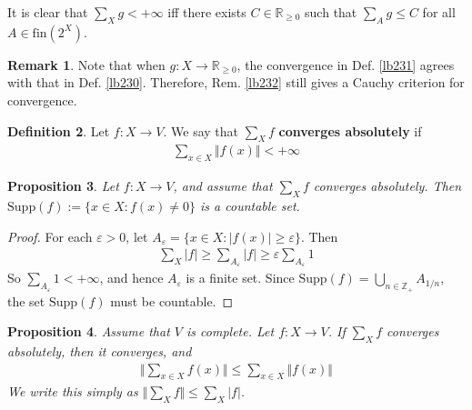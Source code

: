 \documentclass[12pt,b5paper,notitlepage]{article}
\theoremstyle{definition}
\newtheorem{df}{Definition}[subsection]
\newtheorem{rem}[df]{Remark}
\theoremstyle{plain}
\newtheorem{pp}[df]{Proposition}
\newcommand{\Zbb}{\mathbb Z}
\newcommand{\Rbb}{\mathbb R}
\newcommand{\fin}{\mathrm{fin}}
\newcommand{\Supp}{\mathrm{Supp}}
\newcommand{\eps}{\varepsilon}
\numberwithin{equation}{section}
\begin{document}
It is clear that $\sum_Xg<+\infty$ iff there exists $C\in\Rbb_{\geq0}$ such that $\sum_Ag\leq C$ for all $A\in\fin(2^X)$.


\begin{rem}
Note that when $g:X\rightarrow\Rbb_{\geq0}$, the convergence in Def. \ref{lb231} agrees with that in Def. \ref{lb230}. Therefore, Rem. \ref{lb232} still gives a Cauchy criterion for convergence.
\end{rem}



\begin{df}
Let $f:X\rightarrow V$. We say that $\sum_Xf$ \textbf{converges absolutely}  if 
\begin{align*}
\sum_{x\in X}\Vert f(x)\Vert<+\infty
\end{align*}
\end{df}

\begin{pp}\label{lb235}
Let $f:X\rightarrow V$, and assume that $\sum_Xf$ converges absolutely. Then $\Supp(f):=\{x\in X:f(x)\neq0\}$ is a countable set.
\end{pp}

\begin{proof}
For each $\eps>0$, let $A_\eps=\{x\in X:|f(x)|\geq \eps\}$. Then
\begin{align*}
\sum_X|f|\geq\sum_{A_\eps}|f|\geq\eps\sum_{A_\eps}1
\end{align*}
So $\sum_{A_\eps}1<+\infty$, and hence $A_\eps$ is a finite set. Since $\Supp(f)=\bigcup_{n\in\Zbb_+}A_{1/n}$, the set $\Supp(f)$ must be countable.
\end{proof}





\begin{pp}\label{lb234}
Assume that $V$ is complete. Let $f:X\rightarrow V$. If  $\sum_Xf$ converges absolutely, then it converges, and
\begin{align}\label{eq130}
\Big\Vert \sum_{x\in X} f(x) \Big\Vert\leq\sum_{x\in X} \Vert f(x)\Vert 
\end{align}
We write this simply as $\Vert\sum_X f\Vert\leq\sum_X |f|$.
\end{pp}
\end{document}
